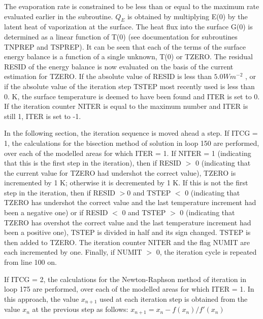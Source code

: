 The evaporation rate is constrained to be less than or equal to the maximum rate evaluated earlier in the subroutine. $Q_E$ is obtained by multiplying E(0) by the latent heat of vaporization at the surface. The heat flux into the surface G(0) is determined as a linear function of T(0) (see documentation for subroutines T\+N\+P\+R\+E\+P and T\+S\+P\+R\+E\+P). It can be seen that each of the terms of the surface energy balance is a function of a single unknown, T(0) or T\+Z\+E\+R\+O. The residual R\+E\+S\+I\+D of the energy balance is now evaluated on the basis of the current estimation for T\+Z\+E\+R\+O. If the absolute value of R\+E\+S\+I\+D is less than $5.0 W m^{-2}$ , or if the absolute value of the iteration step T\+S\+T\+E\+P most recently used is less than 0. K, the surface temperature is deemed to have been found and I\+T\+E\+R is set to 0. If the iteration counter N\+I\+T\+E\+R is equal to the maximum number and I\+T\+E\+R is still 1, I\+T\+E\+R is set to -\/1.

In the following section, the iteration sequence is moved ahead a step. If I\+T\+C\+G = 1, the calculations for the bisection method of solution in loop 150 are performed, over each of the modelled areas for which I\+T\+E\+R = 1. If N\+I\+T\+E\+R = 1 (indicating that this is the first step in the iteration), then if R\+E\+S\+I\+D $>$ 0 (indicating that the current value for T\+Z\+E\+R\+O had undershot the correct value), T\+Z\+E\+R\+O is incremented by 1 K; otherwise it is decremented by 1 K. If this is not the first step in the iteration, then if R\+E\+S\+I\+D $>$0 and T\+S\+T\+E\+P $<$ 0 (indicating that T\+Z\+E\+R\+O has undershot the correct value and the last temperature increment had been a negative one) or if R\+E\+S\+I\+D $<$ 0 and T\+S\+T\+E\+P $>$ 0 (indicating that T\+Z\+E\+R\+O has overshot the correct value and the last temperature increment had been a positive one), T\+S\+T\+E\+P is divided in half and its sign changed. T\+S\+T\+E\+P is then added to T\+Z\+E\+R\+O. The iteration counter N\+I\+T\+E\+R and the flag N\+U\+M\+I\+T are each incremented by one. Finally, if N\+U\+M\+I\+T $>$ 0, the iteration cycle is repeated from line 100 on.

If I\+T\+C\+G = 2, the calculations for the Newton-\/\+Raphson method of iteration in loop 175 are performed, over each of the modelled areas for which I\+T\+E\+R = 1. In this approach, the value $x_{n+1}$ used at each iteration step is obtained from the value $x_n$ at the previous step as follows\+: $x_{n+1} = x_n - f(x_n )/f'(x_n )$

